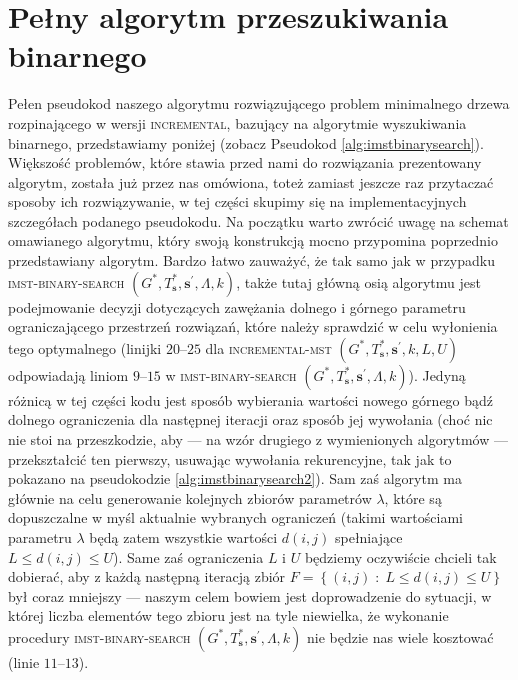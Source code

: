 \newpage

\section{Pełny algorytm przeszukiwania binarnego}

Pełen pseudokod naszego algorytmu rozwiązującego problem minimalnego drzewa rozpinającego w wersji \textsc{incremental}, bazujący na algorytmie wyszukiwania binarnego, przedstawiamy poniżej (zobacz Pseudokod \ref{alg:imstbinarysearch}). Większość problemów, które stawia przed nami do rozwiązania prezentowany algorytm, została już przez nas omówiona, toteż zamiast jeszcze raz przytaczać sposoby ich rozwiązywanie, w tej części skupimy się na implementacyjnych szczegółach podanego pseudokodu. Na początku warto zwrócić uwagę na schemat omawianego algorytmu, który swoją konstrukcją mocno przypomina poprzednio przedstawiany algorytm. Bardzo łatwo zauważyć, że tak samo jak w przypadku \textsc{imst-binary-search} $\left( G^{\ast}, T^{\ast}_{\textbf{s}}, \textbf{s}^{\prime}, \Lambda, k \right)$, także tutaj główną osią algorytmu jest podejmowanie decyzji dotyczących zawężania dolnego i górnego parametru ograniczającego przestrzeń rozwiązań, które należy sprawdzić w celu wyłonienia tego optymalnego (linijki $20$--$25$ dla \textsc{incremental-mst} $\left( G^{\ast}, T^{\ast}_{\textbf{s}}, \textbf{s}^{\prime}, k, L, U \right)$ odpowiadają liniom $9$--$15$ w \textsc{imst-binary-search} $\left( G^{\ast}, T^{\ast}_{\textbf{s}}, \textbf{s}^{\prime}, \Lambda, k \right)$). Jedyną różnicą w tej części kodu jest sposób wybierania wartości nowego górnego bądź dolnego ograniczenia dla następnej iteracji oraz sposób jej wywołania (choć nic nie stoi na przeszkodzie, aby --- na wzór drugiego z wymienionych algorytmów --- przekształcić ten pierwszy, usuwając wywołania rekurencyjne, tak jak to pokazano na pseudokodzie \ref{alg:imstbinarysearch2}). Sam zaś algorytm ma głównie na celu generowanie kolejnych zbiorów parametrów $\lambda$, które są dopuszczalne w myśl aktualnie wybranych ograniczeń (takimi wartościami parametru $\lambda$ będą zatem wszystkie wartości $d \left( i, j \right)$ spełniające $L \leqslant d \left( i, j \right) \leqslant U$). Same zaś ograniczenia $L$ i $U$ będziemy oczywiście chcieli tak dobierać, aby z każdą następną iteracją zbiór $F = \left\{ \left( i, j \right) \; : \; L \leqslant d \left( i, j \right) \leqslant U \right\}$ był coraz mniejszy --- naszym celem bowiem jest doprowadzenie do sytuacji, w której liczba elementów tego zbioru jest na tyle niewielka, że wykonanie procedury \textsc{imst-binary-search} $\left( G^{\ast}, T^{\ast}_{\textbf{s}}, \textbf{s}^{\prime}, \Lambda, k \right)$ nie będzie nas wiele kosztować (linie $11$--$13$). 

